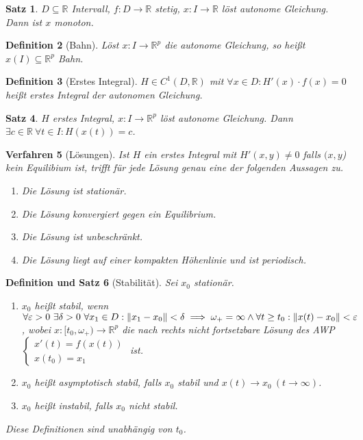 \documentclass[a4paper]{article}
\newcounter{Sec}
\theoremstyle{marginbreak}
\newtheorem{definition}{Definition}[Sec]
\newtheorem{satz}[definition]{Satz}
\newtheorem{defsatz}[definition]{Definition und Satz}
\newtheorem{verfahren}[definition]{Verfahren}
\newcommand{\R}{\mathbb{R}}
\begin{document}
	\begin{satz}
		$D\subseteq\R$ Intervall, $f\colon D\to\R$ stetig, $x\colon I\to\R$ löst autonome Gleichung. Dann ist $x$
		monoton.
	\end{satz}
	\begin{definition}[Bahn]
		Löst $x\colon I\to\R^p$ die autonome Gleichung, so heißt $x(I)\subseteq\R^p$ Bahn.
	\end{definition}
	\begin{definition}[Erstes Integral]
		$H\in C^1(D,\R)$ mit $\forall x\in D: H'(x)\cdot f(x)=0$ heißt erstes Integral der autonomen Gleichung.
	\end{definition}
	\begin{satz}
		$H$ erstes Integral, $x\colon I\to\R^p$ löst autonome Gleichung. Dann $\exists c\in\R~\forall t\in I: H(x(t)) = c$.
	\end{satz}
	\begin{verfahren}[Lösungen]
		Ist $H$ ein erstes Integral mit $H'(x, y)\neq 0$ falls $(x, y$) kein Equilibium ist, trifft für jede Lösung
		genau eine der folgenden Aussagen zu.
		\begin{enumerate}[label=(\alph*)]
			\item Die Lösung ist stationär.
			\item Die Lösung konvergiert gegen ein Equilibrium.
			\item Die Lösung ist unbeschränkt.
			\item Die Lösung liegt auf einer kompakten Höhenlinie und ist periodisch.
		\end{enumerate}
	\end{verfahren}
	\begin{defsatz}[Stabilität]
		Sei $x_0$ stationär.
		\begin{enumerate}[label=(\alph*)]
			\item $x_0$ heißt stabil, wenn $\forall\varepsilon>0~\exists\delta>0~\forall x_1\in D:
				\norm{x_1-x_0}<\delta\implies \omega_+=\infty\wedge\forall t\geq t_0:\norm{x(t)-x_0}<\varepsilon$,
				wobei $x\colon [t_0,\omega_+)\to\R^p$ die nach rechts nicht fortsetzbare Lösung des AWP
				$\begin{cases}x'(t)=f(x(t))\\x(t_0)=x_1\end{cases}$ ist.
			\item $x_0$ heißt asymptotisch stabil, falls $x_0$ stabil und $x(t)\to x_0~(t\to\infty)$.
			\item $x_0$ heißt instabil, falls $x_0$ nicht stabil.
		\end{enumerate}
		Diese Definitionen sind unabhängig von $t_0$.
	\end{defsatz}
\end{document}
